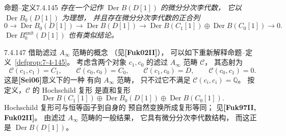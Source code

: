 \begin{statement}{命题--定义}{7.4.145}
\label{defprop:7-4-145}\itshape
存在一个记作
$\operatorname{Der}B(D[1])$
的微分分次李代数，
它以 $\operatorname{Der}B_0(D[1])$ 为理想，
并且存在微分分次李代数的正合列
\begin{equation}
0\longrightarrow
\operatorname{Der}B_0(D[1])
\longrightarrow
\operatorname{Der}B(D[1])
\longrightarrow
\operatorname{Der}B(C_1[1])
\oplus\operatorname{Der}B(C_0[1])
\longrightarrow0.
\tag{7.4.146}\label{eq:7-4-146}
\end{equation}
$\operatorname{Der}B^{\mathrm{unit}}_0(D[1])$
也有类似结论。
\end{statement}

\begin{remark}{7.4.147}\label{rem:7-4-147}
借助滤过 $A_\infty$ 范畴的概念
（见\textbf{[Fuk02II]}），
可以如下重新解释命题--定义~\ref{defprop:7-4-145}。
考虑含两个对象 $c_1,c_0$ 的滤过
$A_\infty$ 范畴 $\mathcal C$，
其态射为
\[
\mathcal C(c_1,c_1)=C_1,\qquad
\mathcal C(c_0,c_0)=C_0,\qquad
\mathcal C(c_1,c_0)=D,\qquad
\mathcal C(c_0,c_1)=0.
\]
这是\textbf{[Sei06]}意义下的一种
有向 $A_\infty$ 范畴，
只不过它不满足
$\mathcal C(c_i,c_i)=\mathbb Q$。
按定义，$\mathcal C$ 的 Hochschild 复形
是直和复形
\[
\operatorname{Der}B(C_1[1])
\oplus\operatorname{Der}B_0(D[1])
\oplus\operatorname{Der}B(C_0[1]).
\]
Hochschild 复形可与恒等函子到自身的
预自然变换所成复形等同；
见\textbf{[Fuk97II, Fuk02II]}。
由滤过 $A_\infty$ 范畴的一般结果，
它具有微分分次李代数结构，
而这正是 $\operatorname{Der}B(D[1])$。
\end{remark}

